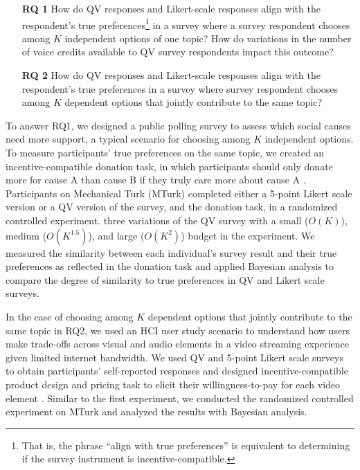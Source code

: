

\begin{itemize}
    \item[\textbf{RQ 1}] How do QV responses and Likert-scale responses align with the respondent's true preferences\footnote{That is, the phrase ``align with true preferences'' is equivalent to determining if the survey instrument is incentive-compatible.} in a survey where a survey respondent chooses among $K$ independent options of one topic? How do variations in the number of voice credits available to QV survey respondents impact this outcome?

    \item[\textbf{RQ 2}] How do QV responses and Likert-scale responses align with the respondent's true preferences in a survey where survey respondent chooses among $K$ dependent options that jointly contribute to the same topic? 
\end{itemize}

To answer RQ1, we designed a public polling survey to assess which social causes need more support, a typical scenario for choosing among $K$ independent options. To measure participants' true preferences on the same topic, we created an incentive-compatible donation task, in which participants should only donate more for cause A than cause B if they truly care more about cause A \cite{champ1997using}. Participants on Mechanical Turk (MTurk) completed either a 5-point Likert scale version or a QV version of the survey, and the donation task, in a randomized controlled experiment.  three variations of the QV survey with a small ($O(K)$), medium ($O(K^{1.5})$), and large ($O(K^2)$) budget in the experiment. We measured the similarity between each individual's survey result and their true preferences as reflected in the donation task and applied Bayesian analysis to compare the degree of similarity to true preferences in QV and Likert scale surveys.

In the case of choosing among $K$ dependent options that jointly contribute to the same topic in RQ2, we used an HCI user study scenario to understand how users make trade-offs across visual and audio elements in a video streaming experience given limited internet bandwidth. We used QV and 5-point Likert scale surveys to obtain participants' self-reported responses and designed  incentive-compatible product design and pricing task to elicit their willingness-to-pay for each video element \cite{roth1982incentive}. Similar to the first experiment, we conducted the randomized controlled experiment on MTurk and analyzed the results with Bayesian analysis.

